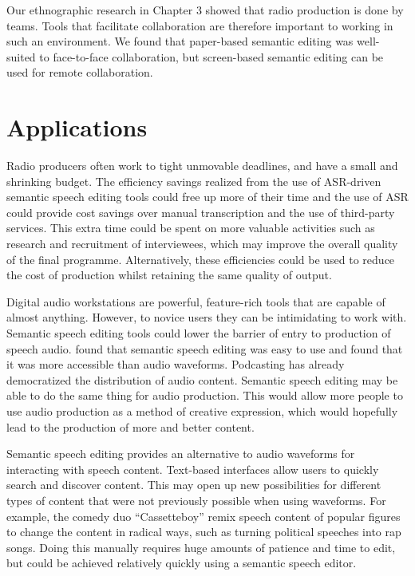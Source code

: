Our ethnographic research in Chapter 3 showed that radio production is done by teams. Tools that facilitate
collaboration are therefore important to working in such an environment. We found that paper-based semantic editing was
well-suited to face-to-face collaboration, but screen-based semantic editing can be used for remote collaboration.

\section{Applications}

Radio producers often work to tight unmovable deadlines, and have a small and shrinking budget. The efficiency savings
realized from the use of ASR-driven semantic speech editing tools could free up more of their time and the use of ASR
could provide cost savings over manual transcription and the use of third-party services. This extra time could be
spent on more valuable activities such as research and recruitment of interviewees, which may improve the overall
quality of the final programme. Alternatively, these efficiencies could be used to reduce the cost of production whilst
retaining the same quality of output.

Digital audio workstations are powerful, feature-rich tools that are capable of almost anything. However, to novice
users they can be intimidating to work with. Semantic speech editing tools could lower the barrier of entry to
production of speech audio. \citet{Yoon2014} found that semantic speech editing was easy to use and
\citet{Sivaraman2016} found that it was more accessible than audio waveforms. Podcasting has already democratized the
distribution of audio content. Semantic speech editing may be able to do the same thing for audio production. This
would allow more people to use audio production as a method of creative expression, which would hopefully lead to the
production of more and better content.

Semantic speech editing provides an alternative to audio waveforms for interacting with speech content. Text-based
interfaces allow users to quickly search and discover content. This may open up new possibilities for different types
of content that were not previously possible when using waveforms. For example, the comedy duo ``Cassetteboy'' remix
speech content of popular figures to change the content in radical ways, such as turning political speeches into rap
songs. Doing this manually requires huge amounts of patience and time to edit, but could be achieved relatively quickly
using a semantic speech editor.

